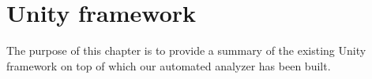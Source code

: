 \chapter{Unity framework}
\label{ch:chapter_framework}%

The purpose of this chapter is to provide a summary of the existing Unity framework on top of which our automated analyzer has been built.